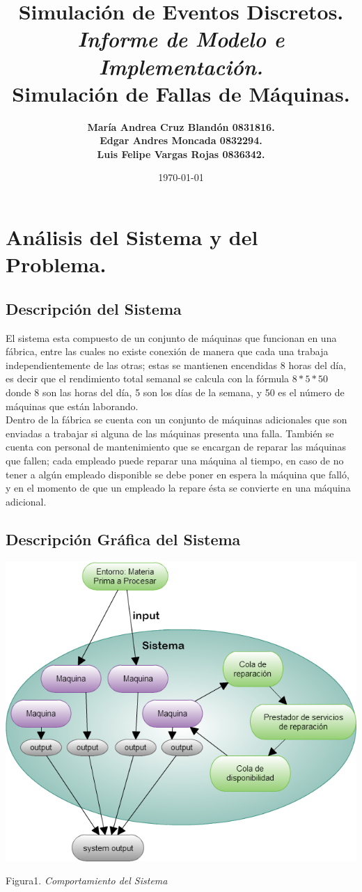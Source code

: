\documentclass[12pt]{article}
\title{Simulación de Eventos Discretos.\\ \emph{Informe de Modelo e Implementación.} \\ \textbf{Simulación de Fallas de Máquinas.} }
\author{\textbf{María Andrea Cruz Blandón  0831816.} \\ \textbf{Edgar Andres Moncada 0832294.  }\\ \textbf{Luis Felipe Vargas Rojas 0836342. }}
\date{\today}
\begin{document}
\maketitle

\section{Análisis del Sistema y del Problema.}
\subsection{Descripción del Sistema}
El sistema esta compuesto de un conjunto de máquinas que funcionan en una fábrica, entre las cuales no existe conexión de manera que cada una trabaja independientemente de las otras; estas se mantienen encendidas 8 horas del día, es decir que el rendimiento total semanal se calcula con la fórmula $8*5*50$ donde 8 son las  horas del día, 5 son los días de la  semana, y 50 es el número de máquinas que están laborando.\\

Dentro de la fábrica se cuenta con un conjunto de máquinas adicionales que son enviadas a trabajar si alguna de las máquinas presenta una falla. También se cuenta con personal de mantenimiento que se encargan de reparar las máquinas que fallen; cada empleado puede reparar una máquina al tiempo, en caso de no tener a algún empleado disponible se debe poner en espera la máquina que falló, y en el momento de que un empleado la repare ésta se convierte en una máquina adicional.


\subsection{Descripción Gráfica del Sistema}
\begin{center}

\includegraphics[scale=0.47]{Simulacion.png}

Figura1. \emph{Comportamiento del Sistema}
\end{center}
\end{document}
